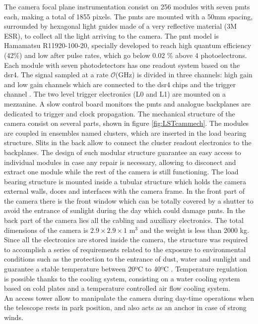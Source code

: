 \documentclass[main.tex]{subfiles}
\begin{document}
  The camera focal plane instrumentation consist on 256 modules with seven \glspl{pmt} each, making a total of 1855 pixels. The \glspl{pmt} are mounted with a 50mm spacing, surrounded by hexagonal light guides made of a very reflective material (3M ESR), to collect all the light arriving to the camera. The \gls{pmt} model is Hamamatsu R11920-100-20, specially developed to reach high quantum efficiency (42\%) and low after pulse rates, which go below 0.02 \% above 4 photoelectrons. Each module with seven photodetectors has one readout system based on the \gls{dsr4}. The signal sampled at a rate $\mathcal{O}$(GHz) is divided in three channels: high gain and low gain channels which are connected to the \gls{dsr4} chips and the trigger channel \cite{2017LST}. The two level trigger electronics (L0 and L1) are mounted on a mezzanine. A slow control board monitors the \glspl{pmt} and analogue backplanes are dedicated to trigger and clock propagation.  
  The mechanical structure of the camera consist on several parts, shown in figure \ref{fig:LSTcammech}. The modules are coupled in ensembles named clusters, which are inserted in the load bearing structure. Slits in the back allow to connect the cluster readout electronics to the  backplanes. The design of such modular structure guarantee an easy access to individual modules in case any repair is necessary, allowing to disconect and extract one module while the rest of the camera is still functioning.
  The load bearing structure is mounted inside a tubular structure which holds the camera external walls, doors and interfaces with the camera frame. In the front part of the camera there is the front window which can be totally covered by a shutter to avoid the entrance of sunlight during the day which could damage \glspl{pmt}. In the back part of the camera lies all the cabling and auxiliary electronics. The total dimensions of the camera is $2.9\times2.9\times 1$ m$^3$ and the weight is less than 2000 kg. Since all the electronics are stored inside the camera, the structure was required to accomplish a series of requirements related to the exposure to environmental conditions such as the protection to the entrance of dust, water and sunlight and guarantee a stable temperature between 20ºC to 40ºC \cite{2013LSTCamMech}. Temperature regulation is possible thanks to the cooling system, consisting on a water cooling system based on cold plates and a temperature controlled air flow cooling system.\\
 An access tower allow to manipulate the camera during day-time operations when the telescope rests in park position, and also acts as an anchor in case of strong winds. 
\end{document}
